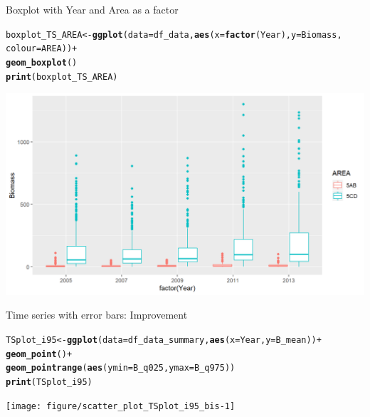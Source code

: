 \documentclass{beamer}\usepackage[]{graphicx}\usepackage[]{color}
\makeatletter
\newcommand{\hlopt}[1]{\textcolor[rgb]{0,0,0}{#1}}%
\newcommand{\hlstd}[1]{\textcolor[rgb]{0.345,0.345,0.345}{#1}}%
\newcommand{\hlkwb}[1]{\textcolor[rgb]{0.69,0.353,0.396}{#1}}%
\newcommand{\hlkwc}[1]{\textcolor[rgb]{0.333,0.667,0.333}{#1}}%
\newcommand{\hlkwd}[1]{\textcolor[rgb]{0.737,0.353,0.396}{\textbf{#1}}}%
\newenvironment{kframe}{%
 \def\at@end@of@kframe{}%
 \ifinner\ifhmode%
  \def\at@end@of@kframe{\end{minipage}}%
  \begin{minipage}{\columnwidth}%
 \fi\fi%
 \def\FrameCommand##1{\hskip\@totalleftmargin \hskip-\fboxsep
 \colorbox{shadecolor}{##1}\hskip-\fboxsep
     \hskip-\linewidth \hskip-\@totalleftmargin \hskip\columnwidth}%
 \MakeFramed {\advance\hsize-\width
   \@totalleftmargin\z@ \linewidth\hsize
   \@setminipage}}%
 {\par\unskip\endMakeFramed%
 \at@end@of@kframe}
\newenvironment{knitrout}{}{} %
\makeatother
\begin{document}
\begin{frame}[fragile]{Boxplot with Year and Area as a factor}
\begin{knitrout}\footnotesize
{}\color{fgcolor}\begin{kframe}
\begin{alltt}
\hlstd{boxplot_TS_AREA} \hlkwb{<-} \hlkwd{ggplot}\hlstd{(}\hlkwc{data}\hlstd{=df_data,} \hlkwd{aes}\hlstd{(}\hlkwc{x}\hlstd{=}\hlkwd{factor}\hlstd{(Year),} \hlkwc{y}\hlstd{=Biomass,}
                                            \hlkwc{colour}\hlstd{=AREA))} \hlopt{+}
  \hlkwd{geom_boxplot}\hlstd{()}
\hlkwd{print}\hlstd{(boxplot_TS_AREA)}
\end{alltt}
\end{kframe}

{\centering \includegraphics[width=.9\linewidth]{figure/boxplot_TSf_AREA-1} 

}



\end{knitrout}
\end{frame}

\begin{frame}[fragile]{Time series with error bars: Improvement}
\begin{knitrout}\footnotesize
{}\color{fgcolor}\begin{kframe}
\begin{alltt}
\hlstd{TSplot_i95} \hlkwb{<-} \hlkwd{ggplot}\hlstd{(}\hlkwc{data}\hlstd{=df_data_summary,} \hlkwd{aes}\hlstd{(}\hlkwc{x}\hlstd{=Year,} \hlkwc{y}\hlstd{=B_mean))} \hlopt{+}
  \hlkwd{geom_point}\hlstd{()} \hlopt{+}
  \hlkwd{geom_pointrange}\hlstd{(}\hlkwd{aes}\hlstd{(}\hlkwc{ymin} \hlstd{= B_q025,} \hlkwc{ymax} \hlstd{= B_q975))}
\hlkwd{print}\hlstd{(TSplot_i95)}
\end{alltt}
\end{kframe}

{\centering \texttt{[image: figure/scatter\_plot\_TSplot\_i95\_bis-1]} 

}



\end{knitrout}
\end{frame}
\end{document}
